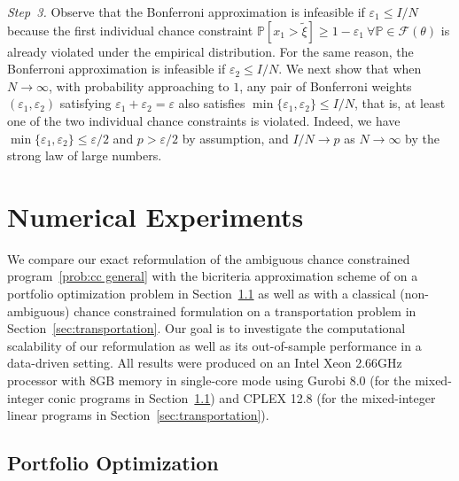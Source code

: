 \documentclass[nonblindrev]{informs2017}
\newcommand{\1}[1]{\mathds{1}{\left(#1\right)}}
\begin{document}
{\em Step~3.} Observe that the Bonferroni approximation is infeasible if $\varepsilon_1 \leq I/N$ because the first individual chance constraint $\mathbb{P} [x_1 > \tilde{\xi}] \geq 1-\varepsilon_1 ~\forall \mathbb{P} \in \mathcal{F}(\theta)$ is already violated under the empirical distribution. For the same reason, the Bonferroni approximation is infeasible if $\varepsilon_2 \leq I/N$. We next show that when $N \to \infty$, with probability approaching to $1$, any pair of Bonferroni weights $(\varepsilon_1, \varepsilon_2)$ satisfying $\varepsilon_1 + \varepsilon_2 = \varepsilon$ also satisfies $\min\{\varepsilon_1, \varepsilon_2\} \leq I/N$, that is, at least one of the two individual chance constraints is violated. Indeed, we have $\min\{\varepsilon_1, \varepsilon_2\} \leq \varepsilon/2$ and $p > \varepsilon/2$ by assumption, and $I/N \to p$ as $N \to \infty$ by the strong law of large numbers.
\hfill \Halmos
\endproof

\section{Numerical Experiments}

We compare our exact reformulation of the ambiguous chance constrained program~\eqref{prob:cc general} with the bicriteria approximation scheme of \cite{xie2018bicriteria} on a portfolio optimization problem in Section~\ref{sec:portfolio} as well as with a classical (non-ambiguous) chance constrained formulation on a transportation problem in Section~\ref{sec:transportation}. Our goal is to investigate the computational scalability of our reformulation as well as its out-of-sample performance in a data-driven setting. All results were produced on an Intel Xeon 2.66GHz processor with 8GB memory in single-core mode using Gurobi 8.0 (for the mixed-integer conic programs in Section~\ref{sec:portfolio}) and CPLEX 12.8 (for the mixed-integer linear programs in Section~\ref{sec:transportation}).


\subsection{Portfolio Optimization}\label{sec:portfolio}
\end{document}
